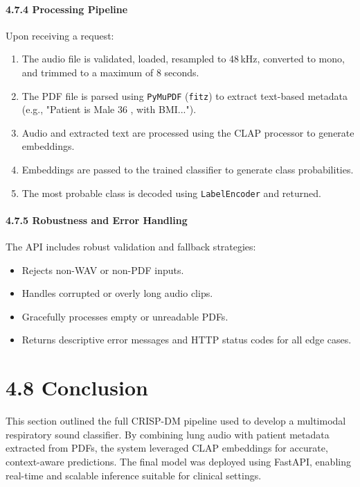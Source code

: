 \paragraph{4.7.4 Processing Pipeline\\}
Upon receiving a request:
\begin{enumerate}
    \item The audio file is validated, loaded, resampled to 48\,kHz, converted to mono, and trimmed to a maximum of 8 seconds.
    \item The PDF file is parsed using \texttt{PyMuPDF} (\texttt{fitz}) to extract text-based metadata (e.g., "Patient is Male 36 , with BMI...").
    \item Audio and extracted text are processed using the CLAP processor to generate embeddings.
    \item Embeddings are passed to the trained classifier to generate class probabilities.
    \item The most probable class is decoded using \texttt{LabelEncoder} and returned.
\end{enumerate}

\paragraph{4.7.5 Robustness and Error Handling\\}
The API includes robust validation and fallback strategies:
\begin{itemize}
    \item Rejects non-WAV or non-PDF inputs.
    \item Handles corrupted or overly long audio clips.
    \item Gracefully processes empty or unreadable PDFs.
    \item Returns descriptive error messages and HTTP status codes for all edge cases.
\end{itemize}

\section*{4.8 Conclusion}
This section outlined the full CRISP-DM pipeline used to develop a multimodal respiratory sound classifier. By combining lung audio with patient metadata extracted from PDFs, the system leveraged CLAP embeddings for accurate, context-aware predictions. The final model was deployed using FastAPI, enabling real-time and scalable inference suitable for clinical settings.

